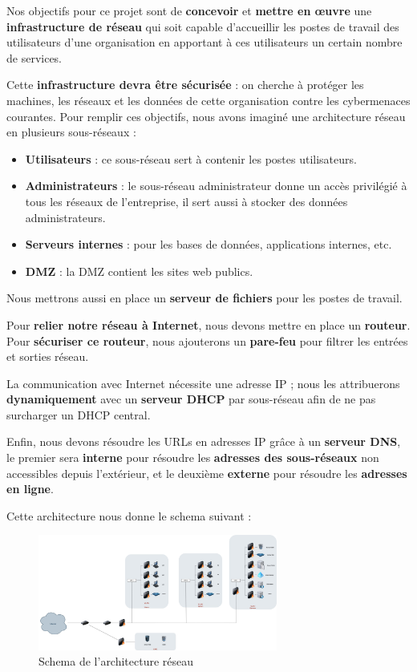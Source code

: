 \documentclass[../Livrable1.tex]{subfiles}
\begin{document}
Nos objectifs pour ce projet sont de \textbf{concevoir} et \textbf{mettre en œuvre} une \textbf{infrastructure de réseau} qui soit capable d’accueillir les postes de travail des utilisateurs d’une organisation en apportant à ces utilisateurs un certain nombre de services.

Cette \textbf{infrastructure devra être sécurisée} : on cherche à protéger les machines, les réseaux et les données de cette organisation contre les cybermenaces courantes.  
Pour remplir ces objectifs, nous avons imaginé une architecture réseau en plusieurs sous-réseaux :

\begin{itemize}
    \item \textbf{Utilisateurs} : ce sous-réseau sert à contenir les postes utilisateurs.
    \item \textbf{Administrateurs} : le sous-réseau administrateur donne un accès privilégié à tous les réseaux de l’entreprise, il sert aussi à stocker des données administrateurs.
    \item \textbf{Serveurs internes} : pour les bases de données, applications internes, etc.
    \item \textbf{DMZ} : la DMZ contient les sites web publics.
\end{itemize}

Nous mettrons aussi en place un \textbf{serveur de fichiers} pour les postes de travail.

Pour \textbf{relier notre réseau à Internet}, nous devons mettre en place un \textbf{routeur}. Pour \textbf{sécu\-ri\-ser ce routeur}, nous ajouterons un \textbf{pare-feu} pour filtrer les entrées et sorties réseau.

La communication avec Internet nécessite une adresse IP ; nous les attribuerons \textbf{dyna\-mi\-quement} avec un \textbf{serveur DHCP} par sous-réseau afin de ne pas surcharger un DHCP central.

Enfin, nous devons résoudre les URLs en adresses IP grâce à un \textbf{serveur DNS}, le premier sera \textbf{interne} pour résoudre les \textbf{adresses des sous-réseaux} non accessibles depuis l’extérieur, et le deuxième \textbf{externe} pour résoudre les \textbf{adresses en ligne}.

Cette architecture nous donne le schema suivant : 
\begin{figure}[h]
    \centering
    \includegraphics[width=0.7\textwidth]{../images/Architecture.jpg}
    \caption{Schema de l'architecture réseau}
    \label{fig:architecture}
\end{figure}
\end{document}

